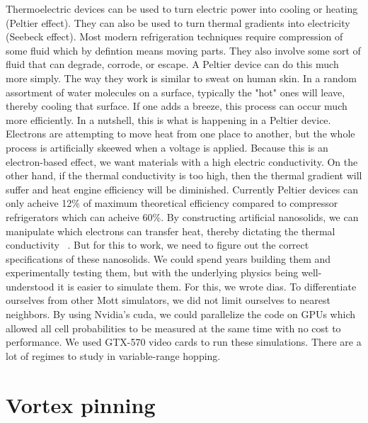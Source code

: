 Thermoelectric devices can be used to turn electric power into cooling or heating (Peltier effect). They can also be used to turn thermal gradients into electricity (Seebeck effect). Most modern refrigeration techniques require compression of some fluid which by defintion means moving parts. They also involve some sort of fluid that can degrade, corrode, or escape. A Peltier device can do this much more simply. The way they work is similar to sweat on human skin. In a random assortment of water molecules on a surface, typically the "hot" ones will leave, thereby cooling that surface. If one adds a breeze, this process can occur much more efficiently. In a nutshell, this is what is happening in a Peltier device. Electrons are attempting to move heat from one place to another, but the whole process is artificially skeewed when a voltage is applied. Because this is an electron-based effect, we want materials with a high electric conductivity. On the other hand, if the thermal conductivity is too high, then the thermal gradient will suffer and heat engine efficiency will be diminished. Currently Peltier devices can only acheive 12\% of maximum theoretical efficiency compared to compressor refrigerators which can acheive 60\%. By constructing artificial nanosolids, we can manipulate which electrons can transfer heat, thereby dictating the thermal conductivity ~\cite{glatz09}. But for this to work, we need to figure out the correct specifications of these nanosolids. We could spend years building them and experimentally testing them, but with the underlying physics being well-understood it is easier to simulate them. For this, we wrote {\sc dias}. To differentiate ourselves from other Mott simulators, we did not limit ourselves to nearest neighbors.  By using Nvidia's {\sc cuda}, we could parallelize the code on GPUs which allowed all cell probabilities to be measured at the same time with no cost to performance. We used GTX-570 video cards to run these simulations. There are a lot of regimes to study in variable-range hopping.

\section{Vortex pinning}

